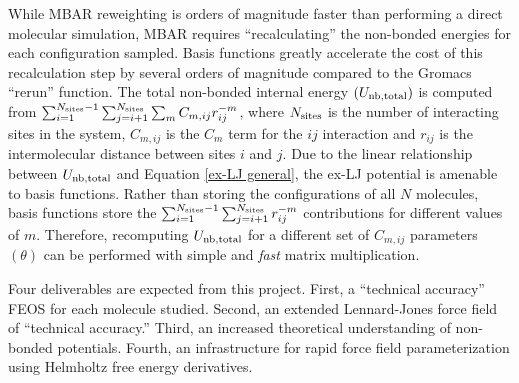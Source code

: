 \documentclass[11pt,a4paper]{article}
\begin{document}
While MBAR reweighting is orders of magnitude faster than performing a direct molecular simulation, MBAR requires ``recalculating'' the non-bonded energies for each configuration sampled. Basis functions greatly accelerate the cost of this recalculation step by several orders of magnitude compared to the Gromacs ``rerun'' function. The total non-bonded internal energy $(U_{\rm nb, total})$ is computed from $\sum_{i=1}^{N_{\rm sites}-1} \sum_{j=i+1}^{N_{\rm sites}} \sum_m C_{m,ij} r_{ij}^{-m}$, where $N_{\rm sites}$ is the number of interacting sites in the system, $C_{m,ij}$ is the $C_{m}$ term for the $ij$ interaction and $r_{ij}$ is the intermolecular distance between sites $i$ and $j$. Due to the linear relationship between $U_{\rm nb, total}$ and Equation \ref{ex-LJ general}, the ex-LJ potential is amenable to basis functions. Rather than storing the configurations of all $N$ molecules, basis functions store the $\sum_{i=1}^{N_{\rm sites}-1} \sum_{j=i+1}^{N_{\rm sites}} r_{ij}^{-m}$ contributions for different values of $m$. Therefore, recomputing $U_{\rm nb, total}$ for a different set of $C_{m,ij}$ parameters $(\theta)$ can be performed with simple and \textit{fast} matrix multiplication.

Four deliverables are expected from this project. First, a ``technical accuracy'' FEOS for each molecule studied. Second, an extended Lennard-Jones force field of ``technical accuracy.'' Third, an increased theoretical understanding of non-bonded potentials. Fourth, an infrastructure for rapid force field parameterization using Helmholtz free energy derivatives. 


\end{document}
